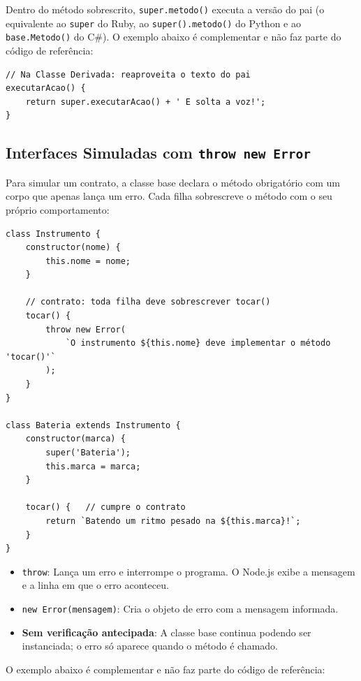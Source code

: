 Dentro do método sobrescrito, \texttt{super.metodo()} executa a versão do pai (o equivalente ao
\texttt{super} do Ruby, ao \texttt{super().metodo()} do Python e ao \texttt{base.Metodo()} do
C\#). O exemplo abaixo é complementar e não faz parte do código de referência:

\begin{lstlisting}[style=javascript]
// Na Classe Derivada: reaproveita o texto do pai
executarAcao() {
    return super.executarAcao() + ' E solta a voz!';
}
\end{lstlisting}

\subsection{Interfaces Simuladas com \texttt{throw new Error}}

Para simular um contrato, a classe base declara o método obrigatório com um corpo que apenas
lança um erro. Cada filha sobrescreve o método com o seu próprio comportamento:

\begin{lstlisting}[style=javascript]
class Instrumento {
    constructor(nome) {
        this.nome = nome;
    }

    // contrato: toda filha deve sobrescrever tocar()
    tocar() {
        throw new Error(
            `O instrumento ${this.nome} deve implementar o método 'tocar()'`
        );
    }
}

class Bateria extends Instrumento {
    constructor(marca) {
        super('Bateria');
        this.marca = marca;
    }

    tocar() {   // cumpre o contrato
        return `Batendo um ritmo pesado na ${this.marca}!`;
    }
}
\end{lstlisting}

\begin{itemize}
    \item \texttt{throw}: Lança um erro e interrompe o programa. O Node.js exibe a mensagem e a
    linha em que o erro aconteceu.

    \item \texttt{new Error(mensagem)}: Cria o objeto de erro com a mensagem informada.

    \item \textbf{Sem verificação antecipada}: A classe base continua podendo ser instanciada; o
    erro só aparece quando o método é chamado.
\end{itemize}

O exemplo abaixo é complementar e não faz parte do código de referência:

